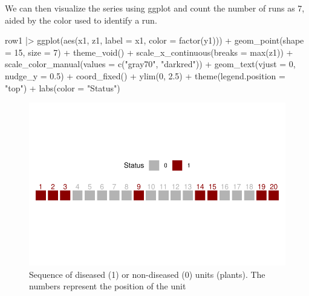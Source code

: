 \documentclass[
  letterpaper,
  DIV=11,
  numbers=noendperiod]{scrreprt}
\newenvironment{Shaded}{\begin{snugshade}}{\end{snugshade}}
\newcommand{\AttributeTok}[1]{\textcolor[rgb]{0.40,0.45,0.13}{#1}}
\newcommand{\DecValTok}[1]{\textcolor[rgb]{0.68,0.00,0.00}{#1}}
\newcommand{\FloatTok}[1]{\textcolor[rgb]{0.68,0.00,0.00}{#1}}
\newcommand{\FunctionTok}[1]{\textcolor[rgb]{0.28,0.35,0.67}{#1}}
\newcommand{\NormalTok}[1]{\textcolor[rgb]{0.00,0.23,0.31}{#1}}
\newcommand{\SpecialCharTok}[1]{\textcolor[rgb]{0.37,0.37,0.37}{#1}}
\newcommand{\StringTok}[1]{\textcolor[rgb]{0.13,0.47,0.30}{#1}}
\begin{document}
We can then visualize the series using ggplot and count the number of
runs as 7, aided by the color used to identify a run.

\begin{Shaded}
\begin{Highlighting}[]
\NormalTok{row1 }\SpecialCharTok{|\textgreater{}}
  \FunctionTok{ggplot}\NormalTok{(}\FunctionTok{aes}\NormalTok{(x1, z1, }\AttributeTok{label =}\NormalTok{ x1, }\AttributeTok{color =} \FunctionTok{factor}\NormalTok{(y1))) }\SpecialCharTok{+}
  \FunctionTok{geom\_point}\NormalTok{(}\AttributeTok{shape =} \DecValTok{15}\NormalTok{, }\AttributeTok{size =} \DecValTok{7}\NormalTok{) }\SpecialCharTok{+}
  \FunctionTok{theme\_void}\NormalTok{() }\SpecialCharTok{+}
  \FunctionTok{scale\_x\_continuous}\NormalTok{(}\AttributeTok{breaks =} \FunctionTok{max}\NormalTok{(z1)) }\SpecialCharTok{+}
  \FunctionTok{scale\_color\_manual}\NormalTok{(}\AttributeTok{values =} \FunctionTok{c}\NormalTok{(}\StringTok{"gray70"}\NormalTok{, }\StringTok{"darkred"}\NormalTok{)) }\SpecialCharTok{+}
  \FunctionTok{geom\_text}\NormalTok{(}\AttributeTok{vjust =} \DecValTok{0}\NormalTok{, }\AttributeTok{nudge\_y =} \FloatTok{0.5}\NormalTok{) }\SpecialCharTok{+}
  \FunctionTok{coord\_fixed}\NormalTok{() }\SpecialCharTok{+}
  \FunctionTok{ylim}\NormalTok{(}\DecValTok{0}\NormalTok{, }\FloatTok{2.5}\NormalTok{) }\SpecialCharTok{+}
  \FunctionTok{theme}\NormalTok{(}\AttributeTok{legend.position =} \StringTok{"top"}\NormalTok{) }\SpecialCharTok{+}
  \FunctionTok{labs}\NormalTok{(}\AttributeTok{color =} \StringTok{"Status"}\NormalTok{)}
\end{Highlighting}
\end{Shaded}

\begin{figure}[H]

{\centering \includegraphics{spatial-tests_files/figure-pdf/fig-runs-1.pdf}

}

\caption{\label{fig-runs}Sequence of diseased (1) or non-diseased (0)
units (plants). The numbers represent the position of the unit}

\end{figure}
\end{document}
